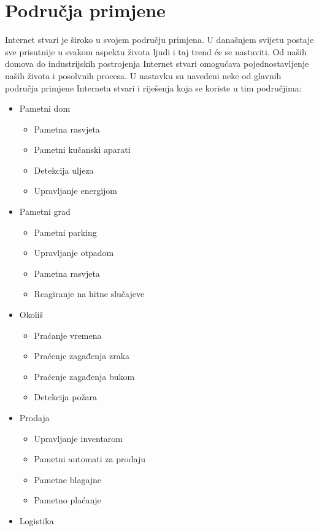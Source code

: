\documentclass[times, utf8, diplomski]{fer}
\begin{document}
\section{Područja primjene}
Internet stvari je široko u svojem području primjena. U današnjem svijetu postaje sve prisutnije u svakom aspektu života ljudi i taj trend će se nastaviti. Od naših domova do industrijskih postrojenja Internet stvari omogućava pojednostavljenje naših života i posolvnih procesa. U nastavku su navedeni neke od glavnih područja primjene Interneta stvari i riješenja koja se koriste u tim područjima:
\begin{itemize}
    \item Pametni dom
    \begin{itemize}
        \item Pametna rasvjeta
        \item Pametni kučanski aparati
        \item Detekcija uljeza
        \item Upravljanje energijom
    \end{itemize}
    \item Pametni grad
    \begin{itemize}
        \item Pametni parking
        \item Upravljanje otpadom
        \item Pametna rasvjeta
        \item Reagiranje na hitne slučajeve
    \end{itemize}
    \item Okoliš
    \begin{itemize}
        \item Praćanje vremena
        \item Praćenje zagađenja zraka
        \item Praćenje zagađenja bukom
        \item Detekcija požara
    \end{itemize}
    \item Prodaja
    \begin{itemize}
        \item Upravljanje inventarom
        \item Pametni automati za prodaju
        \item Pametne blagajne
        \item Pametno plaćanje
    \end{itemize}
    \item Logistika

\end{itemize}
\end{document}
